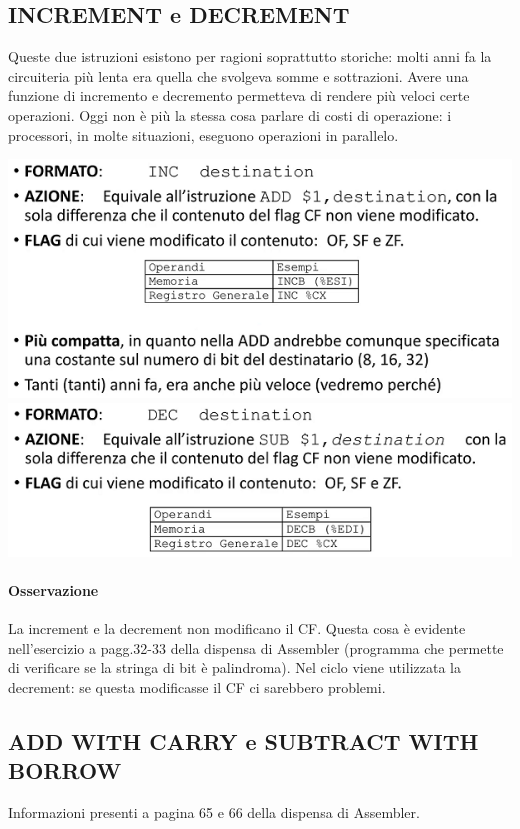 \documentclass[11pt]{report}
\begin{document}
\subsection{INCREMENT e DECREMENT}
Queste due istruzioni esistono per ragioni soprattutto storiche: molti anni fa la circuiteria più lenta era quella che svolgeva somme e sottrazioni. Avere una funzione di incremento e decremento permetteva di rendere più veloci certe operazioni. Oggi non è più la stessa cosa parlare di costi di operazione: i processori, in molte situazioni, eseguono operazioni in parallelo.
\begin{center}
\includegraphics{img/10.PNG}
\includegraphics{img/11.PNG}
\end{center}
\paragraph{Osservazione} La increment e la decrement non modificano il CF. Questa cosa è evidente nell'esercizio a pagg.32-33 della dispensa di Assembler (programma che permette di verificare se la stringa di bit è palindroma). Nel ciclo viene utilizzata la decrement: se questa modificasse il CF ci sarebbero problemi.

\subsection{ADD WITH CARRY e SUBTRACT WITH BORROW}
Informazioni presenti a pagina 65 e 66 della dispensa di Assembler.
\end{document}
